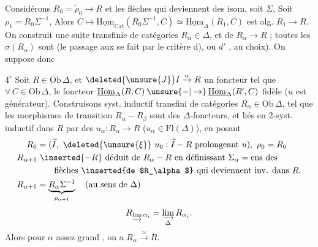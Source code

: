  Considérons $R_0=\widetilde\rho_0\longrightarrow R$ et les flèches qui deviennent des isom, soit $\Sigma$,  Soit  $\rho_1=R_0\Sigma^{-1}$,  Alors $C\mapsto\underline{\mathrm{Hom}}_{\mathrm{Cat}}(R_0\Sigma^{-1},C)\simeq\underline{\mathrm{Hom}}_{\Delta}(R_1,C)$ est alg. $R_1\to R$. On construit une suite transfinie de catégories $R_\alpha\in\Delta$, et de $R_\alpha\to R$ ; toutes les  $\sigma(R_\alpha)$ sont  (le passage aux  se fait par le critère d), ou $d'$\deleted{\unsure{)|!}} , au choix). On suppose donc

\textcircled{$4^\circ$} Soit $R\in\mathrm{Ob}\,\Delta$, et $\deleted{\unsure{J}}I\xrightarrow{u}R$ un foncteur  tel que $\forall\,C\in\mathrm{Ob}\,\Delta$, le foncteur $\underline{\mathrm{Hom}}_\Delta(R,C)\mathbin{\unsure{-|\to}}\underline{\mathrm{Hom}}_{\Delta}(R',C)$ fidèle ($u$ est générateur). Construisons syst. inductif transfini de catégories $R_\alpha\in\mathrm{Ob}\,\Delta$,  tel que les morphismes de transition $R_\alpha\mathbin{-}R_\beta$ sont des $\Delta$-foncteurs, et liés en  2-syst. inductif dans $R$ par des $u_\alpha:R_\alpha\longrightarrow R$  ($u_\alpha\in\mathrm{Fl}(\Delta)$), en posant
\[
\begin{aligned}
R_0 &=(\widetilde I,\ \deleted{\unsure{\xi}}\ u_0:\widetilde I\mathbin{-}R\text{ prolongeant }u),\ \rho_0=R_0\\
R_{\alpha+1}&\ \inserted{\mathbin{-}R}\ \text{déduit de }R_\alpha\mathbin{-}R\text{ en définissant }
\Sigma_\alpha=\text{ens des}\\
&\qquad\text{flèches \inserted{de $R_\alpha$} qui deviennent inv. dans }R.\\
R_{\alpha+1}&=\underbrace{R_\alpha\Sigma^{-1}}_{\rho_{\alpha+1}}\quad\text{(au sens de }\Delta)
\end{aligned}
\]
\[
 R_{\varinjlim\alpha_i}=\varinjlim_{\Delta}R_{\alpha_i}.
\]
Alors pour $\alpha$ assez grand , on a $R_\alpha\xrightarrow{\simeq}R$.

